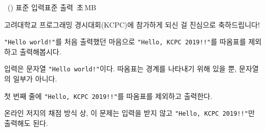 \begin{problem}{\kcpcpprobkcpc\ (\kcpcpprobkcpcshort)}
    {표준 입력}{표준 출력}
    {\kcpcpprobkcpctime\,초}{\kcpcpprobkcpcmemory\,MB}{}
    
    고려대학교 프로그래밍 경시대회(KCPC)에 참가하게 되신 걸 진심으로 축하드립니다!
    
    \texttt{"Hello world!"}를 처음 출력했던 마음으로 \texttt{"Hello, KCPC 2019!!"}를 따옴표를 제외하고 출력해봅시다.
    
    \InputFile
    입력은 문자열 \texttt{"Hello world!"}이다. 따옴표는 경계를 나타내기 위해 있을 뿐, 문자열의 일부가 아니다.
    
    \OutputFile
    첫 번째 줄에 \texttt{"Hello, KCPC 2019!!"}를 따옴표를 제외하고 출력한다.
   
    \Examples
    
    \begin{example}
    \end{example}
    \Note
    온라인 저지의 채점 방식 상, 이 문제는 입력을 받지 않고 \texttt{"Hello, KCPC 2019!!"}만 출력해도 된다.
\end{problem}

